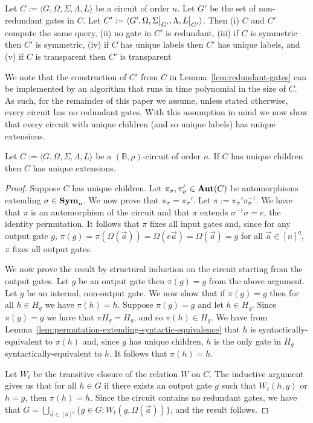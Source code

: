 \documentclass[../main/thesis.tex]{subfiles}
\begin{document}
\begin{lem}
  \label{lem:redundant-gates}
  Let $C := \langle G, \Omega, \Sigma, \Lambda, L \rangle$ be a circuit of order
  $n$. Let $G'$ be the set of non-redundant gates in $C$. Let $C' := \langle G',
  \Omega, \restr{\Sigma}{G'}, \Lambda, \restr{L}{G'} \rangle$. Then (i) $C$ and
  $C'$ compute the same query, (ii) no gate in $C'$ is redundant, (iii) if $C$
  is symmetric then $C'$ is symmetric, (iv) if $C$ has unique labels then $C'$
  has unique labels, and (v) if $C$ is transparent then $C'$ is transparent
\end{lem}

We note that the construction of $C'$ from $C$ in
Lemma~\ref{lem:redundant-gates} can be implemented by an algorithm that runs in
time polynomial in the size of $C$. As such, for the remainder of this paper we
assume, unless stated otherwise, every circuit has no redundant gates. With this
assumption in mind we now show that every circuit with unique children (and so
unique labels) has unique extensions.

\begin{prop}
  Let $C := \langle G, \Omega, \Sigma, \Lambda, L\rangle$ be a $(\mathbb{B},
  \rho)$-circuit of order $n$. If $C$ has unique children then $C$ has unique
  extensions.
  \label{prop:unique-children-unique-extensions}
\end{prop}
\begin{proof}
  Suppose $C$ has unique children. Let $\pi_{\sigma}, \pi_{\sigma}' \in \text{\textbf{Aut}}(C)$
  be automorphisms extending $\sigma \in \text{\textbf{Sym}}_n$. We now prove that $\pi_\sigma
  = \pi_{\sigma}'$. Let $\pi := \pi_{\sigma}'\pi^{-1}_\sigma$. We have that
  $\pi$ is an automorphism of the circuit and that $\pi$ extends
  $\sigma^{-1}\sigma = e$, the identity permutation. It follows that $\pi$ fixes
  all input gates and, since for any output gate $g$, $\pi (g) = \pi
  (\Omega(\vec{a})) = \Omega(e \vec{a}) = \Omega(\vec{a}) = g$ for all $\vec{a}
  \in [n]^q$, $\pi$ fixes all output gates.

  We now prove the result by structural induction on the circuit starting from
  the output gates. Let $g$ be an output gate then $\pi (g) = g$ from the above
  argument. Let $g$ be an internal, non-output gate. We now show that if $\pi
  (g) = g$ then for all $h \in H_g$ we have $\pi (h) = h$. Suppose $\pi (g) = g$
  and let $h \in H_g$. Since $\pi (g) = g$ we have that $\pi H_{g} = H_g$, and
  so $\pi (h) \in H_g$. We have from
  Lemma~\ref{lem:permutation-extending-syntactic-equivalence} that $h$ is
  syntactically-equivalent to $\pi (h)$ and, since $g$ has unique children, $h$
  is the only gate in $H_g$ syntactically-equivalent to $h$. It follows that
  $\pi (h) = h$.
  
  Let $W_t$ be the transitive closure of the relation $W$ on $C$. The inductive
  argument gives us that for all $h \in G$ if there exists an output gate $g$
  such that $W_t(h, g)$ or $h = g$, then $\pi (h) = h$. Since the circuit
  contains no redundant gates, we have that $G = \bigcup_{\vec{a} \in [n]^q} \{g
  \in G : W_t (g, \Omega(\vec{a}))\}$, and the result follows.
\end{proof}
\end{document}
